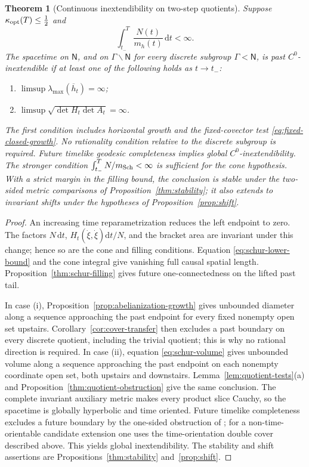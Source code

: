 \documentclass[10pt,a4paper]{article}
\numberwithin{equation}{section}
\newtheorem{theorem}{Theorem}[section]
\theoremstyle{definition}
\theoremstyle{remark}
\newcommand{\dd}{\mathrm d}
\begin{document}
\begin{theorem}[Continuous inextendibility on two-step quotients]
\label{thm:two-step-obstruction}
Suppose $\kappa_{\rm opt}(T)\le\tfrac12$ and
\begin{equation}
 \int_{t_-}^{T}\frac{N(t)}{m_h(t)}\,\dd t<\infty.
 \label{eq:schur-cone-integral}
\end{equation}
The spacetime on $\mathsf N$, and on $\Gamma\backslash\mathsf N$ for
every discrete subgroup $\Gamma<\mathsf N$, is past
$C^0$-inextendible if at least one of the following holds as $t\to t_-$:
\begin{enumerate}[label=\textup{(\roman*)}]
\item $\limsup\lambda_{\max}(\overline h_t)=\infty$;
\item $\limsup\sqrt{\det H_t\det A_t}=\infty$.
\end{enumerate}
The first condition includes horizontal growth and the fixed-covector
test \eqref{eq:fixed-closed-growth}.  No rationality condition relative
to the discrete subgroup is required.  Future timelike geodesic
completeness implies global $C^0$-inextendibility.  The stronger condition
$\int_{t_-}^T N/m_{\rm Sch}<\infty$ is sufficient for the cone hypothesis.
With a strict margin in the filling bound, the conclusion is stable under
the two-sided metric comparisons of Proposition~\ref{thm:stability}; it
also extends to invariant shifts under the hypotheses of
Proposition~\ref{prop:shift}.
\end{theorem}

\begin{proof}
An increasing time reparametrization reduces the left endpoint to zero.
The factors $N\,\dd t$, $H_t(\dot\xi,\dot\xi)\dd t/N$, and the bracket
area are invariant under this change; hence so are the cone and filling
conditions.  Equation \eqref{eq:schur-lower-bound} and the cone integral
give vanishing full causal spatial length.  Proposition~\ref{thm:schur-filling}
gives future one-connectedness on the lifted past tail.

In case \textup{(i)}, Proposition~\ref{prop:abelianization-growth} gives
unbounded diameter along a sequence approaching the past endpoint
for every fixed nonempty open set upstairs.  Corollary~\ref{cor:cover-transfer}
then excludes a past boundary on every discrete quotient, including the
trivial quotient; this is why no rational direction is required.  In case
\textup{(ii)}, equation \eqref{eq:schur-volume} gives unbounded volume along a sequence approaching the past endpoint
on each nonempty coordinate open set, both upstairs and downstairs.
Lemma~\ref{lem:quotient-tests}(a) and
Proposition~\ref{thm:quotient-obstruction} give the same conclusion.
The complete invariant auxiliary metric makes every product slice Cauchy,
so the spacetime is globally hyperbolic and time oriented.  Future
timelike completeness excludes a future boundary by the one-sided
obstruction of \cite{GLS2018}; for a non-time-orientable candidate
extension one uses the time-orientation double cover described above.
This yields global inextendibility.  The stability and shift assertions
are Propositions~\ref{thm:stability} and~\ref{prop:shift}.
\end{proof}
\end{document}
